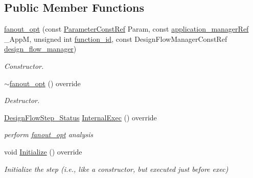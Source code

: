 \subsection*{Public Member Functions}
\begin{DoxyCompactItemize}
\item 
\hyperlink{classfanout__opt_ad5937311d51dbb807722c91383f97fba}{fanout\+\_\+opt} (const \hyperlink{Parameter_8hpp_a37841774a6fcb479b597fdf8955eb4ea}{Parameter\+Const\+Ref} Param, const \hyperlink{application__manager_8hpp_a04ccad4e5ee401e8934306672082c180}{application\+\_\+manager\+Ref} \+\_\+\+AppM, unsigned int \hyperlink{classFunctionFrontendFlowStep_a58ef2383ad1a212a8d3f396625a4b616}{function\+\_\+id}, const Design\+Flow\+Manager\+Const\+Ref \hyperlink{classDesignFlowStep_ab770677ddf087613add30024e16a5554}{design\+\_\+flow\+\_\+manager})
\begin{DoxyCompactList}\small\item\em Constructor. \end{DoxyCompactList}\item 
\hyperlink{classfanout__opt_a312077661dabb5414397a0129bde2a2a}{$\sim$fanout\+\_\+opt} () override
\begin{DoxyCompactList}\small\item\em Destructor. \end{DoxyCompactList}\item 
\hyperlink{design__flow__step_8hpp_afb1f0d73069c26076b8d31dbc8ebecdf}{Design\+Flow\+Step\+\_\+\+Status} \hyperlink{classfanout__opt_aca7aa64720a8242be9722e2216f57344}{Internal\+Exec} () override
\begin{DoxyCompactList}\small\item\em perform \hyperlink{classfanout__opt}{fanout\+\_\+opt} analysis \end{DoxyCompactList}\item 
void \hyperlink{classfanout__opt_a64ba51ab333ce9c993abcd30bca77119}{Initialize} () override
\begin{DoxyCompactList}\small\item\em Initialize the step (i.\+e., like a constructor, but executed just before exec) \end{DoxyCompactList}\end{DoxyCompactItemize}
